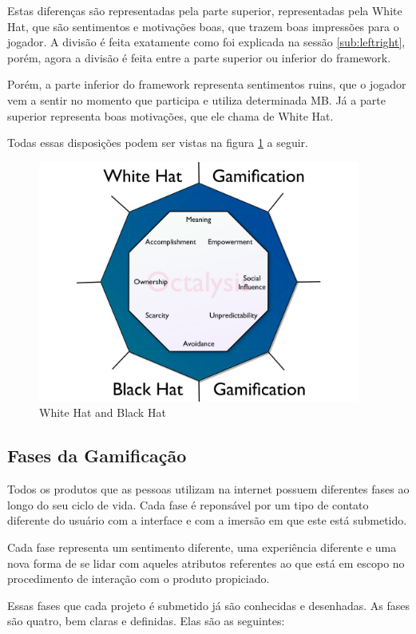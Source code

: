 Estas diferenças são representadas pela parte superior, representadas
pela White Hat, que são sentimentos e motivações boas, que trazem
boas impressões para o jogador. A divisão é feita exatamente como
foi explicada na sessão \ref{sub:leftright}, porém, agora a
divisão é feita entre a parte superior ou inferior do framework.

Porém, a parte inferior do framework representa sentimentos ruins, que o jogador
vem a sentir no momento que participa e utiliza determinada MB. Já a
parte superior representa boas motivações, que ele chama de White Hat.

Todas essas disposições podem ser vistas na figura
\ref{fig:octalysiswhiteblack} a seguir.

\begin{figure}[h]
    \centering
    \includegraphics[width=400px, scale=1]{figuras/octalysiswhiteblack}
    \caption{White Hat and Black Hat}
    \label{fig:octalysiswhiteblack}
\end{figure}

\subsection{Fases da Gamificação}
\label{sub:fasesgamifição}
Todos os produtos que as pessoas utilizam na internet possuem diferentes
fases ao longo do seu ciclo de vida. Cada fase é reponsável por um tipo de contato diferente
do usuário com a interface e com a imersão em que este está submetido.

Cada fase representa um sentimento diferente, uma experiência diferente
e uma nova forma de se lidar com aqueles atributos referentes ao que está
em escopo no procedimento de interação com o produto propiciado.

Essas fases que cada projeto é submetido já são conhecidas e desenhadas. As fases
são quatro, bem claras e definidas. Elas são as seguintes:


